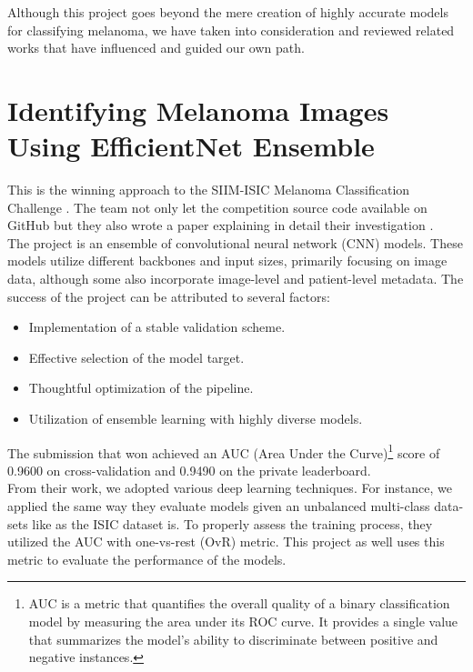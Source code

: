 Although this project goes beyond the mere creation of highly accurate models for classifying melanoma, we have taken into
consideration and reviewed related works that have influenced and guided our own path.

\section{Identifying Melanoma Images Using EfficientNet Ensemble}

This is the winning approach to the SIIM-ISIC Melanoma Classification Challenge \cite{ISICKaggle}. The team not only let the competition source code available on GitHub \cite{WinningISICGithub} but they also wrote a paper explaining in detail their investigation \cite{WinningISIC}. \\

The project is an ensemble of convolutional neural network (CNN) models. These models utilize different backbones and input sizes, primarily focusing on image data, although some also incorporate image-level and patient-level metadata. The success of the project can be attributed to several factors:

\begin{itemize}
    \item Implementation of a stable validation scheme.
    \item Effective selection of the model target.
    \item Thoughtful optimization of the pipeline.
    \item Utilization of ensemble learning with highly diverse models.
\end{itemize}

The submission that won achieved an AUC (Area Under the Curve)\footnote{AUC is a metric that quantifies the overall quality of a binary classification model by measuring the area under its ROC curve. It provides a single value that summarizes the model's ability to discriminate between positive and negative instances.} score of 0.9600 on cross-validation and 0.9490 on the private leaderboard. \\

From their work, we adopted various deep learning techniques. For instance, we applied the same way they evaluate models given
an unbalanced multi-class data-sets like as the ISIC dataset is.
To properly assess the training process, they utilized the AUC with one-vs-rest (OvR) metric. This project as well uses this metric to evaluate the performance of the models. \\

